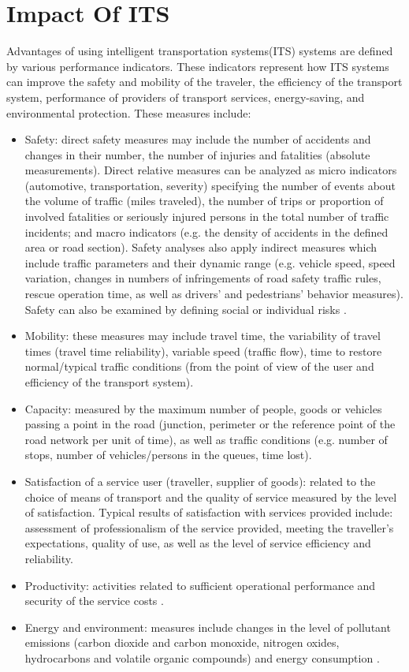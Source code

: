 \section{Impact Of ITS}
Advantages of using intelligent transportation systems(ITS) systems are defined by various performance indicators. These indicators represent how ITS systems can improve the safety and mobility of the traveler, the efficiency of the transport system, performance of providers of transport services, energy-saving, and environmental protection. 
These measures include:
\begin{itemize}
    \item Safety: direct safety measures may include the number of accidents and changes in their number, the number of injuries and fatalities (absolute measurements). Direct relative measures can be analyzed as micro indicators (automotive, transportation, severity) specifying the number of events about the volume of traffic (miles traveled), the number of trips or proportion of involved fatalities or seriously injured persons in the total number of traffic incidents; and macro indicators (e.g. the density of accidents in the defined area or road section). Safety analyses also apply indirect measures which include traffic parameters and their dynamic range (e.g. vehicle speed, speed variation, changes in numbers of infringements of road safety traffic rules, rescue operation time, as well as drivers’ and pedestrians’ behavior measures). Safety can also be examined by defining social or individual risks .

    \item Mobility: these measures may include travel time, the variability of travel times (travel time reliability), variable speed (traffic flow), time to restore normal/typical traffic conditions (from the point of view of the user and efficiency of the transport system).

    \item Capacity: measured by the maximum number of people, goods or vehicles passing a point in the road (junction, perimeter or the reference point of the road network per unit of time), as well as traffic conditions (e.g. number of stops, number of vehicles/persons in the queues, time lost).

    \item Satisfaction of a service user (traveller, supplier of goods): related to the choice of means of transport and the quality of service measured by the level of satisfaction. Typical results of satisfaction with services provided include: assessment of professionalism of the service provided, meeting the traveller’s expectations, quality of use, as well as the level of service efficiency and reliability.

    \item Productivity: activities related to sufficient operational performance and security of the service costs .

    \item Energy and environment: measures include changes in the level of pollutant emissions (carbon dioxide and carbon monoxide, nitrogen oxides, hydrocarbons and volatile organic compounds) and energy consumption .
\end{itemize}

